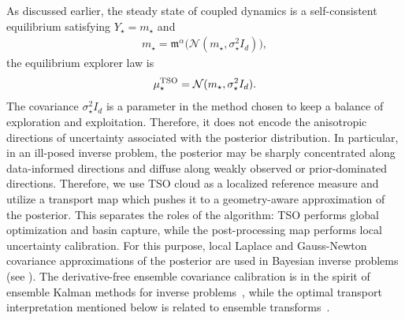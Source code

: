 \documentclass{article}
\def\m{\mathfrak{m}}
\numberwithin{equation}{section}
\begin{document}
As discussed earlier, the steady state of coupled dynamics is a self-consistent equilibrium satisfying $Y_\star=m_\star$ and
\begin{align}
m_\star =
\m^\alpha
\bigl(
\mathcal N(m_\star,\sigma_\star^2 I_d)\bigr),
\label{eq:tso_self_consistency_uq}
\end{align}
the equilibrium explorer law is
\begin{align}
\mu_\star^{\rm TSO}
=
\mathcal N(m_\star,\sigma_\star^2 I_d).
\label{eq:tso_raw_gaussian_uq}
\end{align}
The covariance $\sigma_\star^2 I_d$ is a parameter in the method chosen to keep a balance of exploration and exploitation. Therefore, it does not encode the anisotropic directions of uncertainty associated with the posterior distribution. In particular, in an ill-posed inverse problem, the posterior may be sharply concentrated along data-informed directions and diffuse along weakly observed or prior-dominated directions. Therefore, we use TSO cloud as a localized reference measure and utilize a transport map which pushes it to a geometry-aware approximation of the posterior. This separates the roles of the algorithm: TSO performs global optimization and basin capture, while the post-processing map performs local uncertainty calibration. For this purpose, local Laplace and Gauss-Newton covariance approximations of the posterior are used in Bayesian inverse problems (see \cite{crestel2017optimal}). The derivative-free ensemble covariance calibration is in the spirit of ensemble Kalman methods for inverse problems~\cite{iglesias2013ensemble}, while the optimal transport interpretation mentioned below is related to ensemble transforms~\cite{reich2013nonparametric}.
\end{document}
